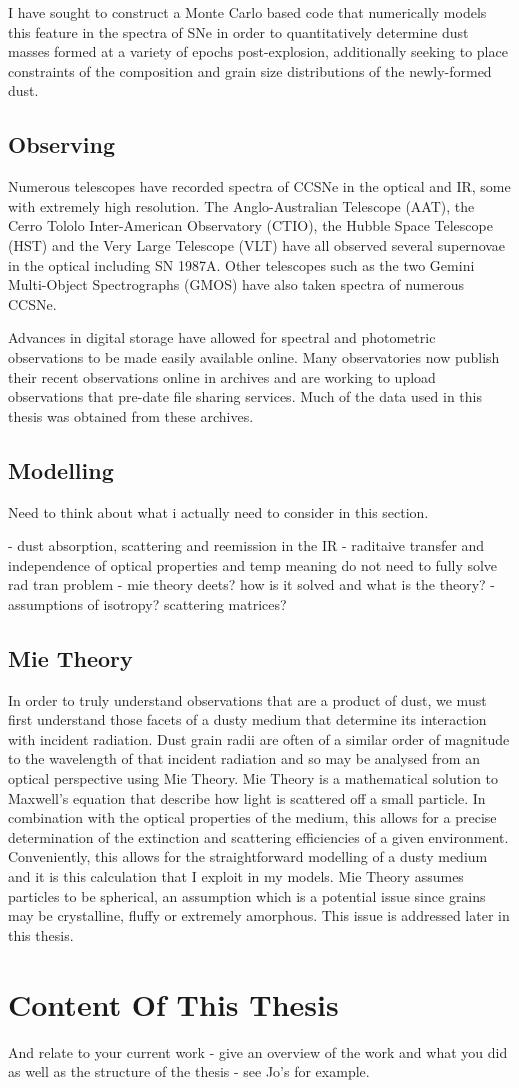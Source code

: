I have sought to construct a Monte Carlo based code that numerically models this feature in the spectra of SNe in order to quantitatively determine dust masses formed at a variety of epochs post-explosion, additionally seeking to place constraints of the composition and grain size distributions of the newly-formed dust.

\subsection{Observing}

Numerous telescopes have recorded spectra of CCSNe in the optical and IR, some with extremely high resolution.  The Anglo-Australian Telescope (AAT), the Cerro Tololo Inter-American Observatory (CTIO), the Hubble Space Telescope (HST) and the Very Large Telescope (VLT) have all observed several supernovae in the optical including SN 1987A.  Other telescopes such as  the two Gemini Multi-Object Spectrographs (GMOS) have also taken spectra of numerous CCSNe.

Advances in digital storage have allowed for spectral and photometric observations to be made easily available online.  Many observatories now publish their recent observations online in archives and are working to upload observations that pre-date file sharing services.  Much of the data used in this thesis was obtained from these archives. 

\subsection{Modelling}
Need to think about what i actually need to consider in this section.

- dust absorption, scattering and reemission in the IR
- raditaive transfer and independence of optical properties and temp meaning do not need to fully solve rad tran problem
- mie theory deets?  how is it solved and what is the theory?
- assumptions of isotropy?  scattering matrices?
\subsection{Mie Theory}

In order to truly understand observations that are a product of dust, we must first understand those facets of a dusty medium that determine its interaction with incident radiation.  Dust grain radii are often of a similar order of magnitude to the wavelength of that incident radiation and so may be analysed from an optical perspective using Mie Theory.  Mie Theory is a mathematical solution to Maxwell's equation that describe how light is scattered off a small particle.  In combination with the optical properties of the medium, this allows for a precise determination of the extinction and scattering efficiencies of a given environment.  Conveniently, this allows for the straightforward modelling of a dusty medium and it is this calculation that I exploit in my models.  Mie Theory assumes particles to be spherical, an assumption which is a potential issue since grains may be crystalline, fluffy or extremely amorphous.  This issue is addressed later in this thesis.



\section{Content Of This Thesis}
And relate to your current work - give an overview of the work and what you did as well as the structure of the thesis - see Jo's for example.
